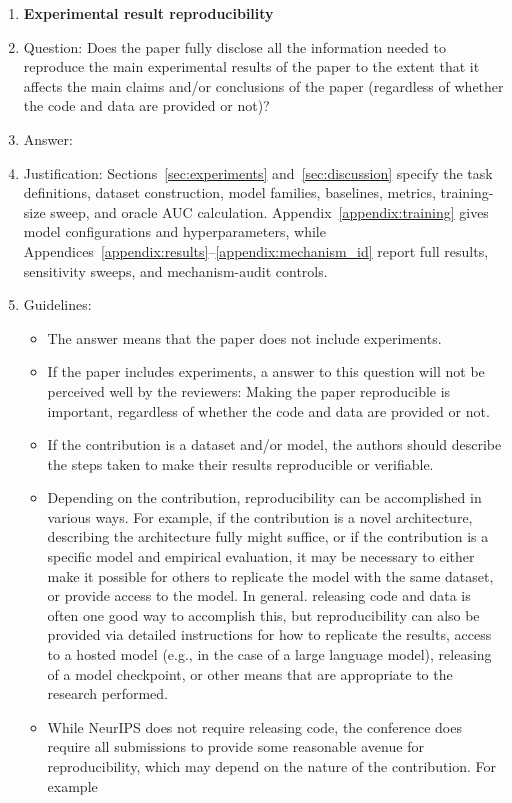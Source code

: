 \documentclass{article}
\theoremstyle{plain}
\theoremstyle{definition}
\theoremstyle{remark}
\begin{document}
\begin{enumerate}
    \item {\bf Experimental result reproducibility}
    \item[] Question: Does the paper fully disclose all the information needed to reproduce the main experimental results of the paper to the extent that it affects the main claims and/or conclusions of the paper (regardless of whether the code and data are provided or not)?
   \item[] Answer: \answerYes{}
    \item[] Justification: Sections~\ref{sec:experiments} and~\ref{sec:discussion} specify the task definitions, dataset construction, model families, baselines, metrics, training-size sweep, and oracle AUC calculation. Appendix~\ref{appendix:training} gives model configurations and hyperparameters, while Appendices~\ref{appendix:results}--\ref{appendix:mechanism_id} report full results, sensitivity sweeps, and mechanism-audit controls.
    \item[] Guidelines:
    \begin{itemize}
        \item The answer \answerNA{} means that the paper does not include experiments.
        \item If the paper includes experiments, a \answerNo{} answer to this question will not be perceived well by the reviewers: Making the paper reproducible is important, regardless of whether the code and data are provided or not.
        \item If the contribution is a dataset and\slash or model, the authors should describe the steps taken to make their results reproducible or verifiable. 
        \item Depending on the contribution, reproducibility can be accomplished in various ways. For example, if the contribution is a novel architecture, describing the architecture fully might suffice, or if the contribution is a specific model and empirical evaluation, it may be necessary to either make it possible for others to replicate the model with the same dataset, or provide access to the model. In general. releasing code and data is often one good way to accomplish this, but reproducibility can also be provided via detailed instructions for how to replicate the results, access to a hosted model (e.g., in the case of a large language model), releasing of a model checkpoint, or other means that are appropriate to the research performed.
        \item While NeurIPS does not require releasing code, the conference does require all submissions to provide some reasonable avenue for reproducibility, which may depend on the nature of the contribution. For example

\end{itemize}
\end{enumerate}
\end{document}

